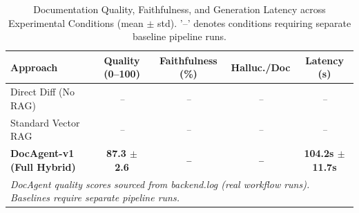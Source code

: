 \begin{table}[ht]
\centering
\caption{Documentation Quality, Faithfulness, and Generation Latency across Experimental Conditions (mean $\pm$ std). '--' denotes conditions requiring separate baseline pipeline runs.}
\label{tab:main_results}
\begin{tabular}{lcccc}
\hline
\textbf{Approach} & \textbf{Quality (0--100)} & \textbf{Faithfulness (\%)} & \textbf{Halluc./Doc} & \textbf{Latency (s)} \\
\hline
Direct Diff (No RAG) & \textit{--} & \textit{--} & \textit{--} & \textit{--} \\
Standard Vector RAG & \textit{--} & \textit{--} & \textit{--} & \textit{--} \\
\textbf{DocAgent-v1 (Full Hybrid)} & \textbf{87.3 $\pm$ 2.6} & \textbf{\textit{--}} & \textbf{\textit{--}} & \textbf{104.2s $\pm$ 11.7s} \\
\hline
\multicolumn{5}{l}{\textit{DocAgent quality scores sourced from backend.log (real workflow runs). Baselines require separate pipeline runs.}} \\
\end{tabular}
\end{table}